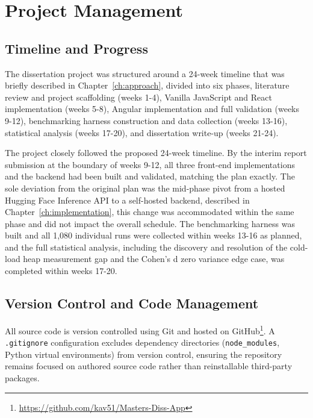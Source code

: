 \documentclass[11pt,a4paper]{report}
\begin{document}
\chapter{Project Management}
\label{ch:project-management}

\section{Timeline and Progress}

\vspace{5mm}

The dissertation project was structured around a 24-week timeline that was briefly described in Chapter~\ref{ch:approach}, divided into six phases, literature review and project scaffolding (weeks 1-4), Vanilla JavaScript and React implementation (weeks 5-8), Angular implementation and full validation (weeks 9-12),  benchmarking harness construction and data collection (weeks 13-16), statistical analysis (weeks 17-20), and dissertation
write-up (weeks 21-24).

\vspace{5mm}

The project closely followed the proposed 24-week timeline. By the interim report submission at the boundary of weeks 9-12, all three front-end implementations and the backend had been built and validated, matching the plan exactly. The sole deviation from the original plan was the mid-phase pivot from a hosted Hugging Face Inference API to a self-hosted backend, described in Chapter~\ref{ch:implementation}, this change was accommodated within the same phase and did not impact the overall schedule. The benchmarking harness was built and all 1,080 individual runs were collected within weeks 13-16 as planned, and the full statistical analysis, including the discovery and resolution of the cold-load heap measurement gap and the Cohen's d zero variance edge case, was completed within weeks 17-20.

\vspace{5mm}

\section{Version Control and Code Management}

\vspace{5mm}

All source code is version controlled using Git and hosted on GitHub\footnote{\url{https://github.com/kav51/Masters-Diss-App}}. A \texttt{.gitignore} configuration excludes dependency directories (\texttt{node\_modules}, Python virtual environments) from version control, ensuring the repository remains focused on authored source code rather than reinstallable third-party packages.
\end{document}
